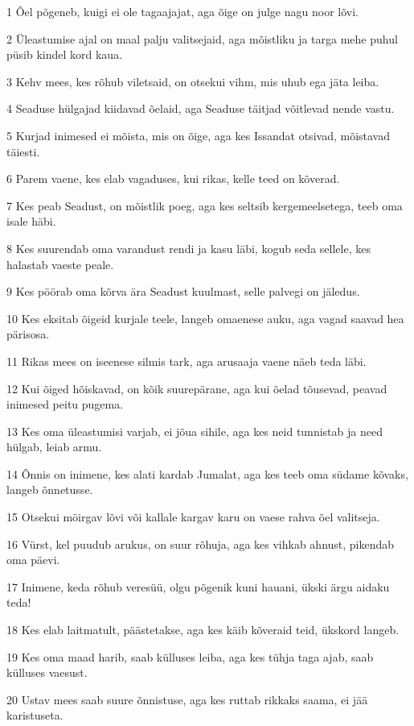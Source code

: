 \par 1 Õel põgeneb, kuigi ei ole tagaajajat, aga õige on julge nagu noor lõvi.
\par 2 Üleastumise ajal on maal palju valitsejaid, aga mõistliku ja targa mehe puhul püsib kindel kord kaua.
\par 3 Kehv mees, kes rõhub viletsaid, on otsekui vihm, mis uhub ega jäta leiba.
\par 4 Seaduse hülgajad kiidavad õelaid, aga Seaduse täitjad võitlevad nende vastu.
\par 5 Kurjad inimesed ei mõista, mis on õige, aga kes Issandat otsivad, mõistavad täiesti.
\par 6 Parem vaene, kes elab vagaduses, kui rikas, kelle teed on kõverad.
\par 7 Kes peab Seadust, on mõistlik poeg, aga kes seltsib kergemeelsetega, teeb oma isale häbi.
\par 8 Kes suurendab oma varandust rendi ja kasu läbi, kogub seda sellele, kes halastab vaeste peale.
\par 9 Kes pöörab oma kõrva ära Seadust kuulmast, selle palvegi on jäledus.
\par 10 Kes eksitab õigeid kurjale teele, langeb omaenese auku, aga vagad saavad hea pärisosa.
\par 11 Rikas mees on iseenese silmis tark, aga arusaaja vaene näeb teda läbi.
\par 12 Kui õiged hõiskavad, on kõik suurepärane, aga kui õelad tõusevad, peavad inimesed peitu pugema.
\par 13 Kes oma üleastumisi varjab, ei jõua sihile, aga kes neid tunnistab ja need hülgab, leiab armu.
\par 14 Õnnis on inimene, kes alati kardab Jumalat, aga kes teeb oma südame kõvaks, langeb õnnetusse.
\par 15 Otsekui möirgav lõvi või kallale kargav karu on vaese rahva õel valitseja.
\par 16 Vürst, kel puudub arukus, on suur rõhuja, aga kes vihkab ahnust, pikendab oma päevi.
\par 17 Inimene, keda rõhub veresüü, olgu põgenik kuni hauani, ükski ärgu aidaku teda!
\par 18 Kes elab laitmatult, päästetakse, aga kes käib kõveraid teid, ükskord langeb.
\par 19 Kes oma maad harib, saab külluses leiba, aga kes tühja taga ajab, saab külluses vaesust.
\par 20 Ustav mees saab suure õnnistuse, aga kes ruttab rikkaks saama, ei jää karistuseta.
